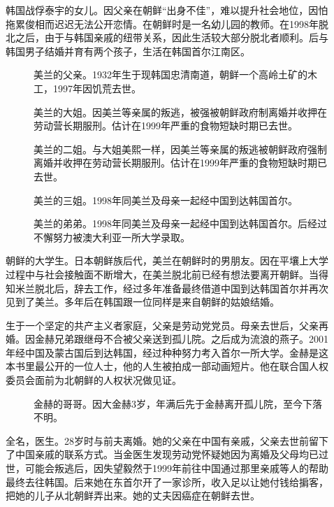 \begin{description}
	\item[] 韩国战俘泰宇的女儿。因父亲在朝鲜“出身不佳”，难以提升社会地位，因怕拖累俊相而迟迟无法公开恋情。在朝鲜时是一名幼儿园的教师。在1998年脱北之后，由于与韩国亲戚的纽带关系，因此生活较大部分脱北者顺利。后与韩国男子结婚并育有两个孩子，生活在韩国首尔江南区。
		{\footnotesize \begin{description}
				\item[] 美兰的父亲。1932年生于现韩国忠清南道，朝鲜一个高岭土矿的木工，1997年因饥荒去世。
				\item[] 美兰的大姐。因美兰等亲属的叛逃，被强被朝鲜政府制离婚并收押在劳动营长期服刑。估计在1999年严重的食物短缺时期已去世。
				\item[] 美兰的二姐。与大姐美熙一样，因美兰等亲属的叛逃被朝鲜政府强制离婚并收押在劳动营长期服刑。估计在1999年严重的食物短缺时期已去世。
				\item[] 美兰的三姐。1998年同美兰及母亲一起经中国到达韩国首尔。
				\item[] 美兰的弟弟。1998年同美兰及母亲一起经中国到达韩国首尔。后经过不懈努力被澳大利亚一所大学录取。
		\end{description}}
	
	\item[] 朝鲜的大学生。日本朝鲜族后代，美兰在朝鲜时的男朋友。因在平壤上大学过程中与社会接触面不断增大，在美兰脱北前已经有想法要离开朝鲜。当得知米兰脱北后，辞去工作，经过多年准备最终借道中国到达韩国首尔并再次见到了美兰。多年后在韩国跟一位同样是来自朝鲜的姑娘结婚。\\
	
	\item[] 生于一个坚定的共产主义者家庭，父亲是劳动党党员。母亲去世后，父亲再婚。因金赫兄弟跟继母不合被父亲送到孤儿院。之后成为流浪的燕子。2001年经中国及蒙古国后到达韩国，经过种种努力考入首尔一所大学。金赫是这本书里最公开的一位人士，他的人生被拍成一部动画短片。他在联合国人权委员会面前为北朝鲜的人权状况做见证。
		{\footnotesize \begin{description}
			\item[] 金赫的哥哥。因大金赫3岁，年满后先于金赫离开孤儿院，至今下落不明。
		\end{description}}
	
	\item[] 全名，医生。28岁时与前夫离婚。她的父亲在中国有亲戚，父亲去世前留下了中国亲戚的联系方式。当金医生发现劳动党怀疑她因为离婚及父母均已过世，可能会叛逃后，因失望毅然于1999年前往中国通过那里亲戚等人的帮助最终去往韩国。后来她在东首尔开了一家诊所，收入足以让她付钱给掮客，把她的儿子从北朝鲜弄出来。她的丈夫因癌症在朝鲜去世。\\
\end{description}